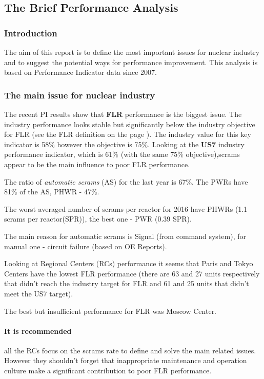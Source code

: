 \subsection*{The Brief Performance Analysis}

\subsubsection*{Introduction}
The aim of this report is to define the most important issues for
nuclear industry and to suggest the potential ways for performance
improvement. This analysis is based on Performance Indicator data
since 2007.

\subsubsection*{The main issue for nuclear industry} 
The recent PI results show that \textbf{FLR} performance is the
biggest issue. The industry performance looks stable but
significantly below the industry objective for FLR (see the FLR
definition on the page \pageref{FLR}). The industry value for this key
indicator is 58\% however the objective is 75\%. Looking at the 
\textbf{US7} industry performance indicator, which is 61\% (with the same 75\%
objective),scrams appear to be the main influence to poor FLR performance.

The ratio of \emph{automatic scrams} (AS) for the last year is 67\%. The
PWRs have 81\% of the AS, PHWR - 47\%.

The worst averaged number of scrams per reactor for 2016 have PHWRs (1.1 scrams
per reactor(SPR)), the best one - PWR (0.39 SPR).

The main reason for automatic scrams is Signal (from command system),
for manual one - circuit failure (based on OE Reports).

Looking at Regional Centers (RCs) performance it seems that Paris and Tokyo
Centers have the lowest FLR performance (there are 63 and 27 units
respectively that didn't reach the industry target for FLR and 61 and
25 units that didn't meet the US7 target).

The best but insufficient performance for FLR was Moscow Center.

\paragraph{It is recommended} all the RCs focus on the scrams rate to
define and solve the main related issues. However they shouldn't
forget that inappropriate maintenance and operation culture make a
significant contribution to poor FLR performance. 

